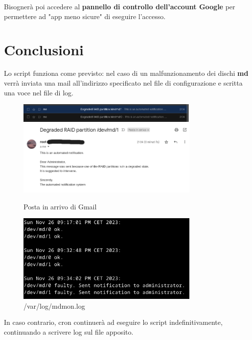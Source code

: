 \documentclass[11pt]{article}
\begin{document}
Bisognerà poi accedere al \textbf{pannello di controllo dell'account Google} per permettere ad "app meno sicure" di eseguire l'accesso.

\pagebreak

\section{Conclusioni}
Lo script funziona come previsto: nel caso di un malfunzionamento dei dischi \textbf{md} verrà inviata una mail all'indirizzo specificato nel file di configurazione e scritta una voce nel file di log. 
\begin{figure}[H]
    \includegraphics[width=0.8\textwidth, keepaspectratio]{../img/inbox.png}
    \centering

    \includegraphics[width=0.8\textwidth, keepaspectratio]{../img/mail.png}
    \centering
    \caption{Posta in arrivo di Gmail}

    \includegraphics[width=0.8\textwidth, keepaspectratio]{../img/log.png}
    \centering
    \caption{/var/log/mdmon.log}
\end{figure}
In caso contrario, cron continuerà ad eseguire lo script indefinitivamente, continuando a scrivere log sul file apposito.
\end{document}
